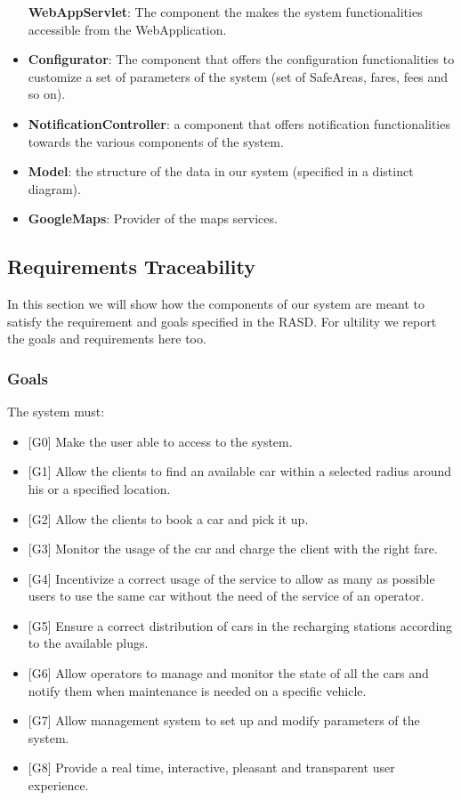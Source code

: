 \documentclass[]{article}
\providecommand{\tightlist}{%
  \setlength{\itemsep}{0pt}\setlength{\parskip}{0pt}}
\begin{document}
\begin{itemize}
  \textbf{WebAppServlet}: The component the makes the system
  functionalities accessible from the WebApplication.
\item
  \textbf{Configurator}: The component that offers the configuration
  functionalities to customize a set of parameters of the system (set of
  SafeAreas, fares, fees and so on).
\item
  \textbf{NotificationController}: a component that offers notification
  functionalities towards the various components of the system.
\item
  \textbf{Model}: the structure of the data in our system (specified in
  a distinct diagram).
\item
  \textbf{GoogleMaps}: Provider of the maps services.
\end{itemize}

\subsection{Requirements Traceability}\label{requirements-traceability}

In this section we will show how the components of our system are meant
to satisfy the requirement and goals specified in the RASD. For ultility
we report the goals and requirements here too.

\subsubsection{Goals}\label{goals}

The system must:

\begin{itemize}
\tightlist
\item
  {[}G0{]} Make the user able to access to the system.
\item
  {[}G1{]} Allow the clients to find an available car within a selected
  radius around his or a specified location.
\item
  {[}G2{]} Allow the clients to book a car and pick it up.
\item
  {[}G3{]} Monitor the usage of the car and charge the client with the
  right fare.
\item
  {[}G4{]} Incentivize a correct usage of the service to allow as many
  as possible users to use the same car without the need of the service
  of an operator.
\item
  {[}G5{]} Ensure a correct distribution of cars in the recharging
  stations according to the available plugs.
\item
  {[}G6{]} Allow operators to manage and monitor the state of all the
  cars and notify them when maintenance is needed on a specific vehicle.
\item
  {[}G7{]} Allow management system to set up and modify parameters of
  the system.
\item
  {[}G8{]} Provide a real time, interactive, pleasant and transparent
  user experience.
\end{itemize}
\end{document}
